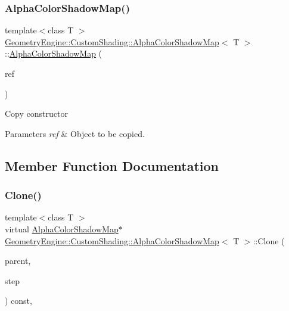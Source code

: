 \subsubsection{\texorpdfstring{AlphaColorShadowMap()}{AlphaColorShadowMap()}\hspace{0.1cm}{\footnotesize\ttfamily [2/2]}}
{\footnotesize\ttfamily template$<$class T $>$ \\
\mbox{\hyperlink{class_geometry_engine_1_1_custom_shading_1_1_alpha_color_shadow_map}{Geometry\+Engine\+::\+Custom\+Shading\+::\+Alpha\+Color\+Shadow\+Map}}$<$ T $>$\+::\mbox{\hyperlink{class_geometry_engine_1_1_custom_shading_1_1_alpha_color_shadow_map}{Alpha\+Color\+Shadow\+Map}} (\begin{DoxyParamCaption}\item[{const \mbox{\hyperlink{class_geometry_engine_1_1_custom_shading_1_1_custom_shading_step}{Custom\+Shading\+Step}} \&}]{ref }\end{DoxyParamCaption})\hspace{0.3cm}{\ttfamily [inline]}}

Copy constructor 
\begin{DoxyParams}{Parameters}
{\em ref} & Object to be copied. \\
\hline
\end{DoxyParams}


\subsection{Member Function Documentation}
\mbox{\label{class_geometry_engine_1_1_custom_shading_1_1_alpha_color_shadow_map_a9c9a47e7868b8ef033626de0994a1733}} 
\subsubsection{\texorpdfstring{Clone()}{Clone()}}
{\footnotesize\ttfamily template$<$class T $>$ \\
virtual \mbox{\hyperlink{class_geometry_engine_1_1_custom_shading_1_1_alpha_color_shadow_map}{Alpha\+Color\+Shadow\+Map}}$\ast$ \mbox{\hyperlink{class_geometry_engine_1_1_custom_shading_1_1_alpha_color_shadow_map}{Geometry\+Engine\+::\+Custom\+Shading\+::\+Alpha\+Color\+Shadow\+Map}}$<$ T $>$\+::Clone (\begin{DoxyParamCaption}\item[{\mbox{\hyperlink{class_geometry_engine_1_1_custom_shading_1_1_custom_shading_interface}{Custom\+Shading\+Interface}} $\ast$}]{parent,  }\item[{\mbox{\hyperlink{namespace_geometry_engine_1_1_custom_shading_a2dc236a5b567da5099069ce2b2be5609}{Custom\+Shading\+Steps}}}]{step }\end{DoxyParamCaption}) const\hspace{0.3cm}{\ttfamily [inline]}, {\ttfamily [virtual]}}

